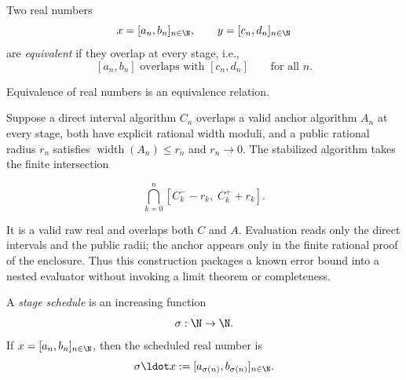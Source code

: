 \begin{definition}\label{def:raw-equiv}
Two real numbers
\[
  x=[a_n,b_n]_{n\in\N},\qquad y=[c_n,d_n]_{n\in\N}
\]
are \emph{equivalent} if they overlap at every stage, i.e.,
\[
  [a_n,b_n] \mbox{ overlaps with } [c_n,d_n]
  \qquad\text{for all }n.
\]
\end{definition}

\begin{proposition}\label{prop:raw-equiv-relation}
Equivalence of real numbers is an equivalence relation.
\end{proposition}

\begin{proposition}
\label{prop:raw-prefix-stabilization}
{\footnotesize\raggedright
{}\par
{}\par}
Suppose a direct interval algorithm $C_n$ overlaps a valid anchor algorithm
$A_n$ at every stage, both have explicit rational width moduli, and a public
rational radius $r_n$ satisfies $\operatorname{width}(A_n)\le r_n$ and
$r_n\to0$.  The stabilized algorithm takes the finite intersection

\[
  \bigcap_{k=0}^{n} [C_k^- - r_k,\;C_k^+ + r_k].
\]

It is a valid raw real and overlaps both $C$ and $A$.  Evaluation reads
only the direct intervals and the public radii; the anchor appears only in the
finite rational proof of the enclosure.  Thus this construction packages a
known error bound into a nested evaluator without invoking a limit theorem or
completeness.
\end{proposition}

\begin{definition}\label{def:stage-schedule}
A \emph{stage schedule} is an increasing function
\[
  \sigma:\N\to\N.
\]
If \(x=[a_n,b_n]_{n\in\N}\), then the scheduled real number is
\[
  \sigma\ldot x:=[a_{\sigma(n)},b_{\sigma(n)}]_{n\in\N}.
\]
\end{definition}

